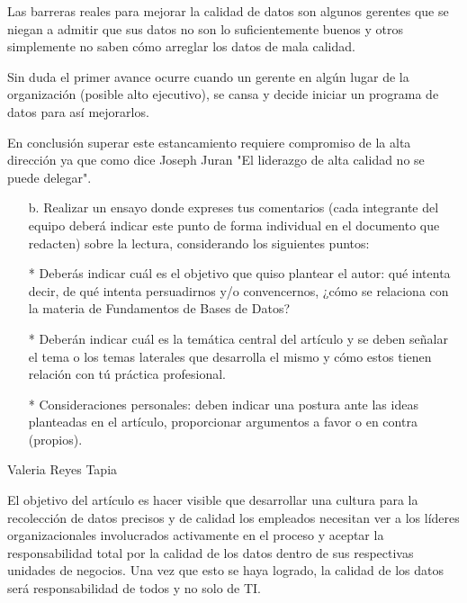 \documentclass{article}
\begin{document}
Las barreras reales para mejorar la calidad de datos son algunos gerentes que se niegan a admitir que sus datos no son lo suficientemente buenos y otros simplemente no saben cómo arreglar los datos de mala calidad.

Sin duda el primer avance ocurre cuando un gerente en algún lugar de la organización  (posible alto ejecutivo), se cansa y decide iniciar un programa de datos para así mejorarlos.

En conclusión superar este estancamiento requiere compromiso de la alta dirección ya que como dice Joseph Juran "El liderazgo de alta calidad no se puede delegar".

\begin{itemize}
    \item[b.]Realizar un ensayo donde expreses tus comentarios (cada integrante del equipo deberá indicar este punto de forma individual en el documento que redacten) sobre la lectura, considerando los siguientes puntos:
\end{itemize}
\begin{itemize}
    \item[*] Deberás indicar cuál es el objetivo que quiso plantear el autor: qué intenta decir, de qué intenta persuadirnos y/o convencernos, ¿cómo se relaciona con la materia de Fundamentos de Bases de Datos?
    \item[*] Deberán indicar cuál es la temática central del artículo y se deben señalar el tema o los temas laterales que desarrolla el mismo y cómo estos tienen relación con tú práctica profesional.
    \item[*] Consideraciones personales: deben indicar una postura ante las ideas planteadas en el artículo, proporcionar argumentos a favor o en contra (propios).
\end{itemize}
\begin{itemize}
\begin{center} 
\item[Valeria Reyes Tapia]
\end{center}
\end{itemize}

El objetivo del artículo es hacer visible que desarrollar una cultura para la recolección de datos precisos y de calidad los empleados necesitan ver a los líderes organizacionales involucrados activamente en el proceso y aceptar la responsabilidad total por la calidad de los datos dentro de sus respectivas unidades de negocios. Una vez que esto se haya logrado, la calidad de los datos será responsabilidad de todos y no solo de TI. 
\end{document}
